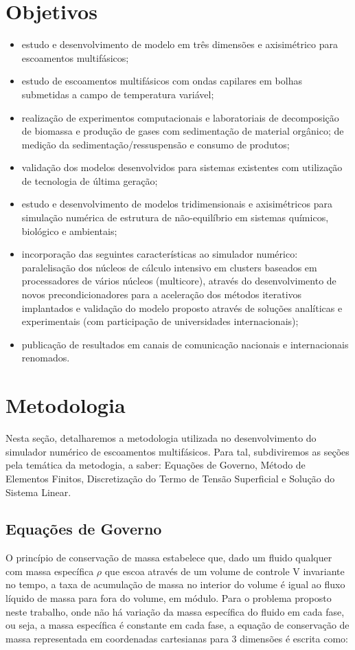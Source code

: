 \documentclass[a4paper,portuges]{article}
\begin{document}
\section{Objetivos}
\begin{itemize}
	\item estudo e desenvolvimento de modelo em três dimensões e axisimétrico
	      para escoamentos multifásicos;
	\item estudo de escoamentos multifásicos com ondas capilares em bolhas
	      submetidas a campo de temperatura variável;
	\item realização de experimentos computacionais e laboratoriais de
		  decomposição de biomassa e produção de gases com sedimentação
		  de material orgânico; de medição da sedimentação/ressuspensão
		  e consumo de produtos;
	\item validação dos modelos desenvolvidos para sistemas existentes com
	      utilização de tecnologia de última geração;
	\item estudo e desenvolvimento de modelos tridimensionais e axisimétricos
		  para simulação numérica de estrutura de não-equilíbrio em
		  sistemas químicos, biológico e ambientais;
	\item incorporação das seguintes características ao simulador numérico:
		  paralelisação dos núcleos de cálculo intensivo em clusters
		  baseados em processadores de vários núcleos (multicore),
		  através do desenvolvimento de novos precondicionadores para a
		  aceleração dos métodos iterativos implantados e validação do
		  modelo proposto através de soluções analíticas e experimentais
		  (com participação de universidades internacionais);
	\item publicação de resultados em canais de comunicação nacionais e
	      internacionais renomados.
\end{itemize}

\section{Metodologia}
Nesta seção, detalharemos a metodologia utilizada no desenvolvimento do
simulador numérico de escoamentos multifásicos. Para tal, subdiviremos
as seções pela temática da metodogia, a saber: Equações de Governo,
Método de Elementos Finitos, Discretização do Termo de Tensão
Superficial e Solução do Sistema Linear.

\subsection{Equações de Governo}
O princípio de conservação de massa estabelece que, dado um fluido
qualquer com massa específica $\rho$ que escoa através de um volume de
controle V invariante no tempo, a taxa de acumulação de massa no
interior do volume é igual ao fluxo líquido de massa para fora do
volume, em módulo. Para o problema proposto neste trabalho, onde não há
variação da massa específica do fluido em cada fase, ou seja, a massa
específica é constante em cada fase, a equação de conservação de massa
representada em coordenadas cartesianas para 3 dimensões é escrita como:
\end{document}
